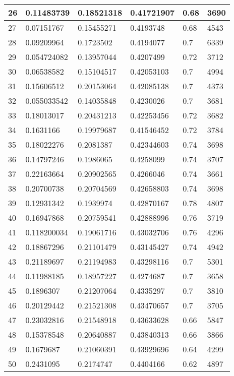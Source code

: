 \begin{longtable}{|l|l|l|l|l|l|}
26 & 0.11483739 & 0.18521318 & 0.41721907 & 0.68 & 3690 \\ \hline 
27 & 0.07151767 & 0.15455271 & 0.4193748 & 0.68 & 4543 \\ \hline 
28 & 0.09209964 & 0.1723502 & 0.4194077 & 0.7 & 6339 \\ \hline 
29 & 0.054724082 & 0.13957044 & 0.4207499 & 0.72 & 3712 \\ \hline 
30 & 0.06538582 & 0.15104517 & 0.42053103 & 0.7 & 4994 \\ \hline 
31 & 0.15606512 & 0.20153064 & 0.42085138 & 0.7 & 4373 \\ \hline 
32 & 0.055033542 & 0.14035848 & 0.4230026 & 0.7 & 3681 \\ \hline 
33 & 0.18013017 & 0.20431213 & 0.42253456 & 0.72 & 3682 \\ \hline 
34 & 0.1631166 & 0.19979687 & 0.41546452 & 0.72 & 3784 \\ \hline 
35 & 0.18022276 & 0.2081387 & 0.42344603 & 0.74 & 3698 \\ \hline 
36 & 0.14797246 & 0.1986065 & 0.4258099 & 0.74 & 3707 \\ \hline 
37 & 0.22163664 & 0.20902565 & 0.4266046 & 0.74 & 3661 \\ \hline 
38 & 0.20700738 & 0.20704569 & 0.42658803 & 0.74 & 3698 \\ \hline 
39 & 0.12931342 & 0.1939974 & 0.42870167 & 0.78 & 4807 \\ \hline 
40 & 0.16947868 & 0.20759541 & 0.42888996 & 0.76 & 3719 \\ \hline 
41 & 0.118200034 & 0.19061716 & 0.43032706 & 0.76 & 4296 \\ \hline 
42 & 0.18867296 & 0.21101479 & 0.43145427 & 0.74 & 4942 \\ \hline 
43 & 0.21189697 & 0.21194983 & 0.43298116 & 0.7 & 5301 \\ \hline 
44 & 0.11988185 & 0.18957227 & 0.4274687 & 0.7 & 3658 \\ \hline 
45 & 0.1896307 & 0.21207064 & 0.4335297 & 0.7 & 3810 \\ \hline 
46 & 0.20129442 & 0.21521308 & 0.43470657 & 0.7 & 3705 \\ \hline 
47 & 0.23032816 & 0.21548918 & 0.43633628 & 0.66 & 5847 \\ \hline 
48 & 0.15378548 & 0.20640887 & 0.43840313 & 0.66 & 3866 \\ \hline 
49 & 0.1679687 & 0.21060391 & 0.43929696 & 0.64 & 4299 \\ \hline 
50 & 0.2431095 & 0.2174747 & 0.4404166 & 0.62 & 4897 \\ \hline 
\end{longtable}
